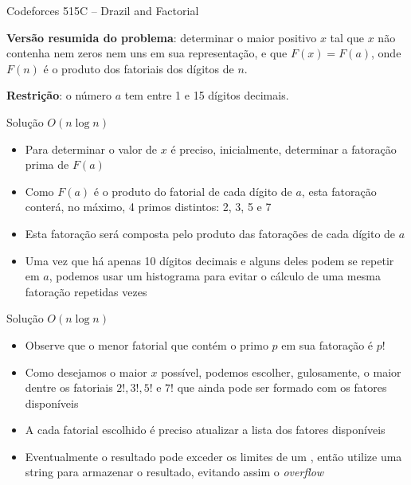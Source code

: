 \begin{frame}[fragile]{Codeforces 515C -- Drazil and Factorial}

    \textbf{Versão resumida do problema}: determinar o maior positivo $x$ tal que $x$ não
        contenha nem zeros nem uns em sua representação, e que $F(x) = F(a)$, onde
        $F(n)$ é o produto dos fatoriais dos dígitos de $n$.

    \vspace{0.1in}
    \textbf{Restrição}: o número $a$ tem entre 1 e 15 dígitos decimais.

\end{frame}

\begin{frame}[fragile]{Solução $O(n\log n)$}

    \begin{itemize}
        \item Para determinar o valor de $x$ é preciso, inicialmente, determinar a fatoração
            prima de $F(a)$

        \item Como $F(a)$ é o produto do fatorial de cada dígito de $a$, esta fatoração conterá,
            no máximo, 4 primos distintos: 2, 3, 5 e 7

        \item Esta fatoração será composta pelo produto das fatorações de cada dígito de $a$

        \item Uma vez que há apenas 10 dígitos decimais e alguns deles podem se repetir em
            $a$, podemos usar um histograma para evitar o cálculo de uma mesma fatoração
            repetidas vezes
    \end{itemize}

\end{frame}

\begin{frame}[fragile]{Solução $O(n\log n)$}

    \begin{itemize}
        \item Observe que o menor fatorial que contém o primo $p$ em sua fatoração é $p!$

        \item Como desejamos o maior $x$ possível, podemos escolher, gulosamente, o maior
            dentre os fatoriais $2!, 3!, 5!$ e $7!$ que ainda pode ser formado com os fatores
            disponíveis

        \item A cada fatorial escolhido é preciso atualizar a lista dos fatores disponíveis

        \item Eventualmente o resultado pode exceder os limites de um ,
            então utilize uma string para armazenar o resultado, evitando assim o \textit{overflow}
    \end{itemize}

\end{frame}

